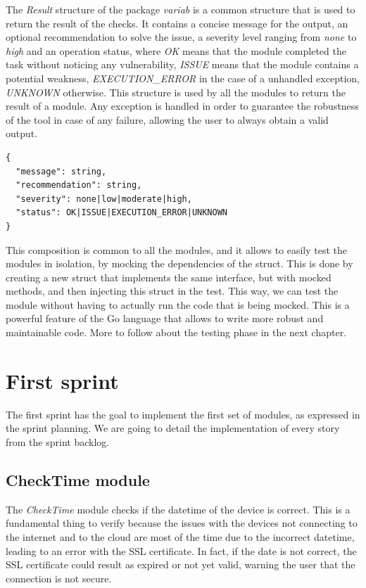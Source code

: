The \textit{Result} structure of the package \textit{variab} is a common structure that is used to return the result of the checks. It contains a concise message for the output, an optional recommendation to solve the issue, a severity level ranging from \textit{none} to \textit{high} and an operation status, where \textit{OK} means that the module completed the task without noticing any vulnerability, \textit{ISSUE} means that the module contains a potential weakness, \textit{EXECUTION\_ERROR} in the case of a unhandled exception, \textit{UNKNOWN} otherwise. This structure is used by all the modules to return the result of a module. Any exception is handled in order to guarantee the robustness of the tool in case of any failure, allowing the user to always obtain a valid output.

\begin{lstlisting}[style=json, caption={Result struct}]
{
  "message": string,
  "recommendation": string,
  "severity": none|low|moderate|high,
  "status": OK|ISSUE|EXECUTION_ERROR|UNKNOWN
}
\end{lstlisting}

This composition is common to all the modules, and it allows to easily test the modules in isolation, by mocking the dependencies of the struct. This is done by creating a new struct that implements the same interface, but with mocked methods, and then injecting this struct in the test. This way, we can test the module without having to actually run the code that is being mocked. This is a powerful feature of the Go language that allows to write more robust and maintainable code. More to follow about the testing phase in the next chapter.

\section{First sprint}

The first sprint has the goal to implement the first set of modules, as expressed in the sprint planning. We are going to detail the implementation of every story from the sprint backlog.

\subsection{CheckTime module}

The \textit{CheckTime} module checks if the datetime of the device is correct. This is a fundamental thing to verify because the issues with the devices not connecting to the internet and to the cloud are most of the time due to the incorrect datetime, leading to an error with the SSL certificate. In fact, if the date is not correct, the SSL certificate could result as expired or not yet valid, warning the user that the connection is not secure.

